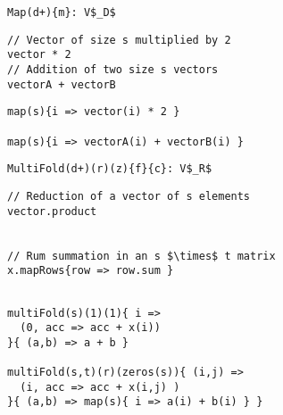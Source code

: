 \begin{figure*}
\centering

\newsavebox{\Map}
\begin{lrbox}{\Map}
\begin{lstlisting}[language=PPLTable]
Map(d+){m}: V$_D$
\end{lstlisting}
\end{lrbox}

\newsavebox{\MapHLL}
\begin{lrbox}{\MapHLL}
\begin{lstlisting}[language=PPLTable]
// Vector of size s multiplied by 2
vector * 2
// Addition of two size s vectors
vectorA + vectorB
\end{lstlisting}
\end{lrbox}

\newsavebox{\MapPPL}
\begin{lrbox}{\MapPPL}
\begin{lstlisting}[language=PPLTable]
map(s){i => vector(i) * 2 }

map(s){i => vectorA(i) + vectorB(i) }
\end{lstlisting}
\end{lrbox}

\newsavebox{\MultiFold}
\begin{lrbox}{\MultiFold}
\begin{lstlisting}[language=PPLTable]
MultiFold(d+)(r)(z){f}{c}: V$_R$
\end{lstlisting}
\end{lrbox}

\newsavebox{\MultiFoldHLL}
\begin{lrbox}{\MultiFoldHLL}
\begin{lstlisting}[language=PPLTable]
// Reduction of a vector of s elements
vector.product


// Rum summation in an s $\times$ t matrix
x.mapRows{row => row.sum }


\end{lstlisting}
\end{lrbox}

\newsavebox{\MultiFoldPPL}
\begin{lrbox}{\MultiFoldPPL}
\begin{lstlisting}[language=PPLTable]
multiFold(s)(1)(1){ i =>
  (0, acc => acc + x(i))
}{ (a,b) => a + b }

multiFold(s,t)(r)(zeros(s)){ (i,j) =>
  (i, acc => acc + x(i,j) )
}{ (a,b) => map(s){ i => a(i) + b(i) } }
\end{lstlisting}
\end{lrbox}


\end{figure*}
